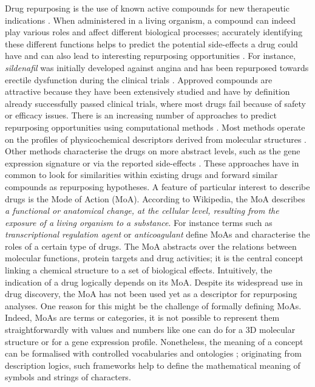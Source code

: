\documentclass{bioinfo}
\begin{document}
Drug repurposing is the use of known active compounds for new therapeutic indications \citep{Sanseau01072011}. 
When administered in a living organism, a compound can indeed play various roles and affect different biological processes; 
accurately identifying these different functions helps to predict the potential side-effects a drug could have and can also lead to 
interesting repurposing opportunities \citep{Medina-Franco2013}. For instance, \emph{sildenafil} was initially developed 
against angina and has been repurposed towards erectile dysfunction during the clinical trials \citep{Ashburn2004}. Approved compounds are 
attractive because they have been extensively studied and have by definition already successfully passed clinical trials, where 
most drugs fail because of safety or efficacy issues.
There is an increasing number of approaches to predict repurposing opportunities using computational methods \citep{Sanseau01072011}. Most 
methods operate on the profiles of physicochemical descriptors derived from molecular structures \citep{Haupt2011}. Other methods characterise 
the drugs on more abstract levels, such as the gene expression signature \citep{Iorio2010} or 
via the reported side-effects \citep{Campillos2008}. 
These approaches 
have in common to look for similarities within existing drugs and forward similar compounds as repurposing hypotheses.
A feature of particular interest to describe drugs is the Mode of Action (MoA). According to Wikipedia, 
the MoA describes \emph{a functional or anatomical change, 
at the cellular level, resulting from the exposure of a living organism to a substance}. For instance 
terms such as \emph{transcriptional regulation agent} or \emph{anticoagulant} define MoAs and characterise the 
roles of a certain type of drugs. The 
MoA abstracts over the relations between molecular functions, protein targets and drug activities; it is the central concept linking a 
chemical structure to a set of biological effects. Intuitively, the indication of a drug logically depends on its MoA.
Despite its widespread use in drug discovery, the MoA has not been used yet as a descriptor for repurposing analyses. One reason for this 
might be the challenge of formally defining MoAs. Indeed, MoAs are terms or categories, it is not possible to represent 
them straightforwardly with values and numbers like one can do for a 3D molecular structure or for a gene expression profile. 
Nonetheless, the meaning of a concept can be formalised with controlled vocabularies and ontologies \citep{Gruber1995}; 
originating from description logics, such frameworks help to define the mathematical meaning of symbols and strings of characters. 
\end{document}

